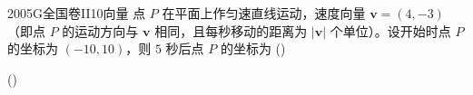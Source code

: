 
\begin{problem}{2005}{G}{全国卷II}{10}{向量}
点 $ P $ 在平面上作匀速直线运动，速度向量 $\boldsymbol{v}=(4,-3)$（即点 $ P $ 的运动方向与 $ \boldsymbol{v} $ 相同，且每秒移动的距离为 $ |\boldsymbol{v}| $ 个单位）。设开始时点 $ P $ 的坐标为 $ (-10,10) $，则 $ 5 $ 秒后点 $ P $ 的坐标为 (\hspace{1cm})

(\hspace{1cm})
\begin{choices}
\end{choices}
\end{problem}

\begin{answer}

\end{answer}

\begin{solutions}

\end{solutions}